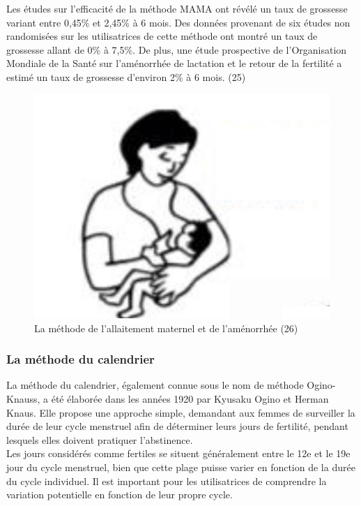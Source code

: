 \noindent Les études sur l'efficacité de la méthode MAMA ont révélé un taux de grossesse variant entre 0,45\% et 2,45\% à 6 mois. Des données provenant de six études non randomisées sur les utilisatrices de cette méthode ont montré un taux de grossesse allant de 0\% à 7,5\%. De plus, une étude prospective de l'Organisation Mondiale de la Santé sur l'aménorrhée de lactation et le retour de la fertilité a estimé un taux de grossesse d'environ 2\% à 6 mois. (25)

\begin{figure}[H]
  \centering
  \includegraphics[scale=.5]{Images/fig_11.jpg}
  \caption{La méthode de l’allaitement maternel et de l’aménorrhée (26)}
\end{figure}

\subsubsection{La méthode du calendrier }
La méthode du calendrier, également connue sous le nom de méthode Ogino-Knauss, a été élaborée dans les années 1920 par Kyusaku Ogino et Herman Knaus. Elle propose une approche simple, demandant aux femmes de surveiller la durée de leur cycle menstruel afin de déterminer leurs jours de fertilité, pendant lesquels elles doivent pratiquer l'abstinence.\\

\noindent Les jours considérés comme fertiles se situent généralement entre le 12e et le 19e jour du cycle menstruel, bien que cette plage puisse varier en fonction de la durée du cycle individuel. Il est important pour les utilisatrices de comprendre la variation potentielle en fonction de leur propre cycle. \\

